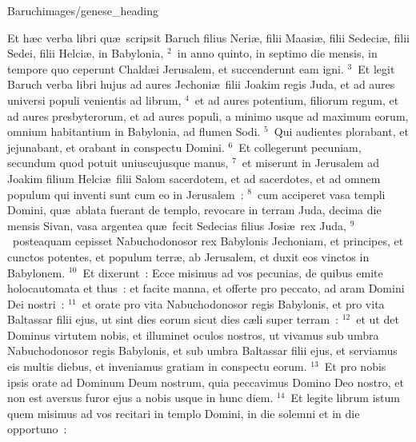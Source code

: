 {Baruch}{images/genese_heading}


\lettrine[lines=6,image=true,loversize=0.05,lraise=-0.03]{E}{}t h\ae c verba libri qu\ae\ scripsit Baruch filius Neri\ae , filii Maasi\ae , filii Sedeci\ae , filii Sedei, filii Helci\ae , in Babylonia,
${}^{2}$~in anno quinto, in septimo die mensis, in tempore quo ceperunt Chald\ae i Jerusalem, et succenderunt eam igni.
${}^{3}$~Et legit Baruch verba libri hujus ad aures Jechoni\ae\ filii Joakim regis Juda, et ad aures universi populi venientis ad librum,
${}^{4}$~et ad aures potentium, filiorum regum, et ad aures presbyterorum, et ad aures populi, a minimo usque ad maximum eorum, omnium habitantium in Babylonia, ad flumen Sodi.
${}^{5}$~Qui audientes plorabant, et jejunabant, et orabant in conspectu Domini.
${}^{6}$~Et collegerunt pecuniam, secundum quod potuit uniuscujusque manus,
${}^{7}$~et miserunt in Jerusalem ad Joakim filium Helci\ae\ filii Salom sacerdotem, et ad sacerdotes, et ad omnem populum qui inventi sunt cum eo in Jerusalem~:
${}^{8}$~cum acciperet vasa templi Domini, qu\ae\ ablata fuerant de templo, revocare in terram Juda, decima die mensis Sivan, vasa argentea qu\ae\ fecit Sedecias filius Josi\ae\ rex Juda,
${}^{9}$~posteaquam cepisset Nabuchodonosor rex Babylonis Jechoniam, et principes, et cunctos potentes, et populum terr\ae , ab Jerusalem, et duxit eos vinctos in Babylonem.
${}^{10}$~Et dixerunt~: Ecce misimus ad vos pecunias, de quibus emite holocautomata et thus~: et facite manna, et offerte pro peccato, ad aram Domini Dei nostri~:
${}^{11}$~et orate pro vita Nabuchodonosor regis Babylonis, et pro vita Baltassar filii ejus, ut sint dies eorum sicut dies c\ae li super terram~:
${}^{12}$~et ut det Dominus virtutem nobis, et illuminet oculos nostros, ut vivamus sub umbra Nabuchodonosor regis Babylonis, et sub umbra Baltassar filii ejus, et serviamus eis multis diebus, et inveniamus gratiam in conspectu eorum.
${}^{13}$~Et pro nobis ipsis orate ad Dominum Deum nostrum, quia peccavimus Domino Deo nostro, et non est aversus furor ejus a nobis usque in hunc diem.
${}^{14}$~Et legite librum istum quem misimus ad vos recitari in templo Domini, in die solemni et in die opportuno~:
